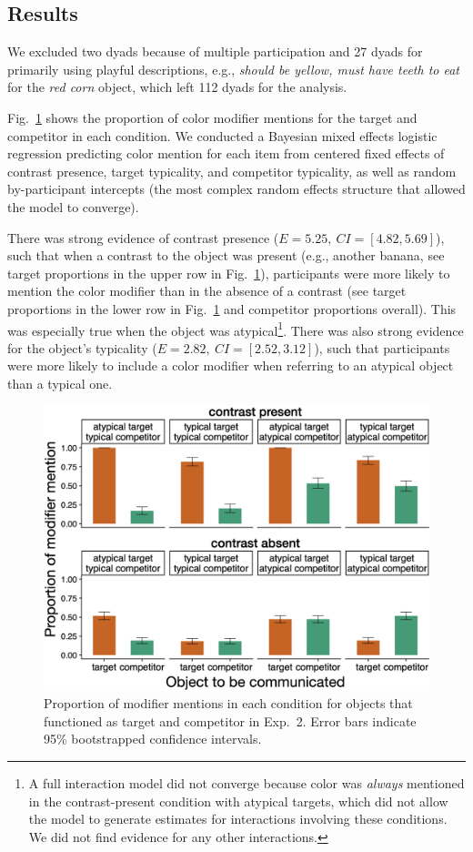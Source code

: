 \documentclass[10pt,letterpaper]{article}
\newcommand{\figref}[1]{Fig.~\ref{#1}}
\begin{document}
\subsection{Results}
We excluded two dyads because of multiple participation and 27 dyads for primarily using playful descriptions, e.g., \textit{should be yellow, must have teeth to eat} for the \textit{red corn} object, which left 112 dyads for the analysis.

\figref{prod-results} shows the proportion of color modifier mentions for the target and competitor in each condition. We conducted a Bayesian mixed effects logistic regression predicting color mention for each item from centered fixed effects of contrast presence, target typicality, and competitor typicality, as well as random by-participant intercepts (the most complex random effects structure that allowed the model to converge). 

There was strong evidence of contrast presence ($E=5.25,\ CI=[4.82, 5.69]$), such that when a contrast to the object was present (e.g., another banana, see target proportions in the upper row in \figref{prod-results}), participants were more likely to mention the color modifier than in the absence of a contrast (see target proportions in the lower row in \figref{prod-results} and competitor proportions overall). This was especially true when the object was atypical\footnote{A full interaction model did not converge because color was \emph{always} mentioned in the contrast-present condition with atypical targets, which did not allow the model to generate estimates for interactions involving these conditions. We did not find evidence for any other interactions.}. There was also strong evidence for the object's typicality ($E=2.82,\ CI=[2.52, 3.12]$), such that participants were more likely to include a color modifier when referring to an atypical object than a typical one.

\begin{figure}
	\begin{center}
		\includegraphics[width=.475\textwidth]{graphs/prod-bycond-paper.pdf}
	\end{center}
\caption{Proportion of modifier mentions in each condition for objects that functioned as target and competitor in Exp.~2. Error bars indicate 95\% bootstrapped confidence intervals.} 
\label{prod-results}
\end{figure}
\end{document}
